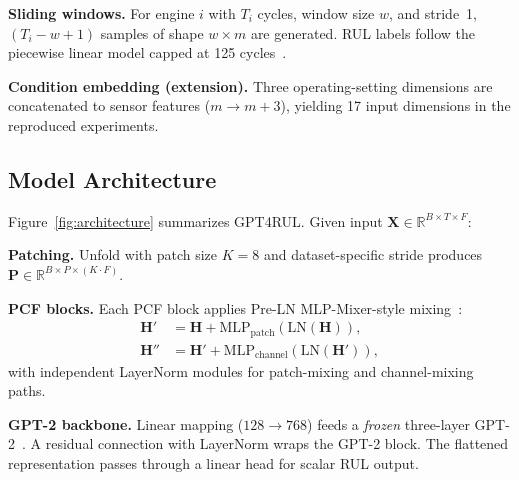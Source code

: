 \documentclass[10pt,twocolumn]{article}
\begin{document}
\textbf{Sliding windows.}
For engine $i$ with $T_i$ cycles, window size $w$, and stride~1, $(T_i - w + 1)$ samples of shape $w \times m$ are generated.
RUL labels follow the piecewise linear model capped at 125 cycles~\cite{saxena2008}.

\textbf{Condition embedding (extension).}
Three operating-setting dimensions are concatenated to sensor features ($m \rightarrow m+3$), yielding 17 input dimensions in the reproduced experiments.

\subsection{Model Architecture}

Figure~\ref{fig:architecture} summarizes GPT4RUL.
Given input $\mathbf{X} \in \mathbb{R}^{B \times T \times F}$:

\textbf{Patching.} Unfold with patch size $K\!=\!8$ and dataset-specific stride produces $\mathbf{P} \in \mathbb{R}^{B \times P \times (K \cdot F)}$.

\textbf{PCF blocks.} Each PCF block applies Pre-LN MLP-Mixer-style mixing~\cite{tolstikhin2021}:
\begin{align}
  \mathbf{H}' &= \mathbf{H} + \mathrm{MLP}_{\mathrm{patch}}(\mathrm{LN}(\mathbf{H})), \\
  \mathbf{H}'' &= \mathbf{H}' + \mathrm{MLP}_{\mathrm{channel}}(\mathrm{LN}(\mathbf{H}')),
\end{align}
with independent LayerNorm modules for patch-mixing and channel-mixing paths.

\textbf{GPT-2 backbone.} Linear mapping ($128 \!\rightarrow\! 768$) feeds a \emph{frozen} three-layer GPT-2~\cite{radford2019}.
A residual connection with LayerNorm wraps the GPT-2 block.
The flattened representation passes through a linear head for scalar RUL output.
\end{document}
